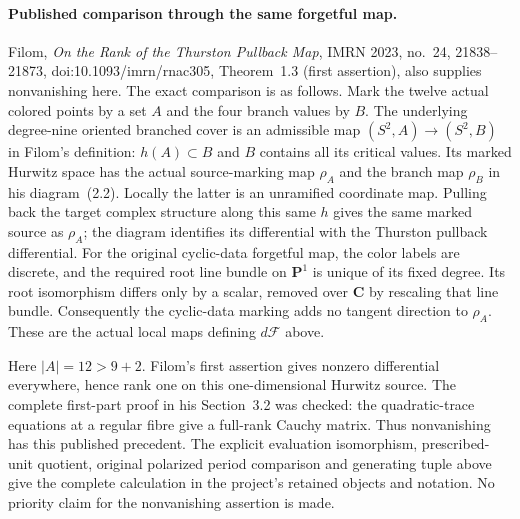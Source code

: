 \paragraph{Published comparison through the same forgetful map.}
Filom, \emph{On the Rank of the Thurston Pullback Map},
IMRN 2023, no.~24, 21838--21873,
doi:10.1093/imrn/rnac305, Theorem~1.3 (first assertion),
also supplies nonvanishing here. The exact comparison
is as follows. Mark the twelve actual colored points
by a set $A$ and the four branch values by $B$.
The underlying degree-nine oriented branched cover is
an admissible map $(S^2,A)\to(S^2,B)$ in Filom's
definition: $h(A)\subset B$ and $B$ contains all its
critical values. Its marked Hurwitz space has the
actual source-marking map $\rho_A$ and the branch map
$\rho_B$ in his diagram~(2.2). Locally the latter is
an unramified coordinate map. Pulling back the target
complex structure along this same $h$ gives the same
marked source as $\rho_A$; the diagram identifies its
differential with the Thurston pullback differential.
For the original cyclic-data forgetful map, the color
labels are discrete, and the required root line bundle
on $\mathbf P^1$ is unique of its fixed degree.
Its root isomorphism differs only by a scalar, removed
over $\mathbf C$ by rescaling that line bundle.
Consequently the cyclic-data marking adds no tangent
direction to $\rho_A$. These are the actual local
maps defining $d\mathcal F$ above.

Here $|A|=12>9+2$. Filom's first assertion gives
nonzero differential everywhere, hence rank one on
this one-dimensional Hurwitz source. The complete
first-part proof in his Section~3.2 was checked:
the quadratic-trace equations at a regular fibre
give a full-rank Cauchy matrix. Thus nonvanishing
has this published precedent. The explicit evaluation
isomorphism, prescribed-unit quotient, original
polarized period comparison and generating tuple
above give the complete calculation in the project's
retained objects and notation. No priority claim for
the nonvanishing assertion is made.
